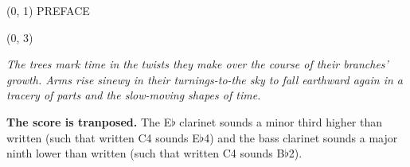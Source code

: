 \documentclass[10pt]{article}
\begin{document}
\begin{textblock}{23}(0, 1)
\center \huge PREFACE
\end{textblock}

\begin{textblock}{23}(0, 3)

\textit{The trees mark time in the twists they make over the course of their
branches' growth. Arms rise sinewy in their turnings-to-the sky to fall
earthward again in a tracery of parts and the slow-moving shapes of time. }

\textbf{The score is tranposed.} The E$\flat$ clarinet sounds a minor third
higher than written (such that written C4 sounds E$\flat$4) and the bass
clarinet sounds a major ninth lower than written (such that written C4 sounds
B$\flat$2).

\end{textblock}
\end{document}
